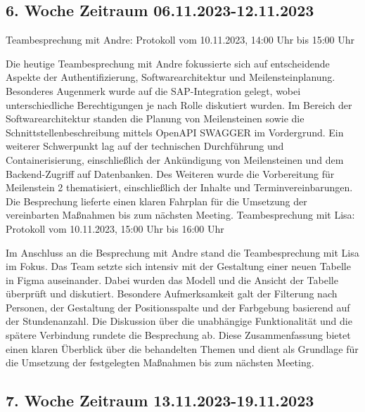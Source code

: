 \documentclass{article}
\begin{document}
\subsection{6. Woche Zeitraum 06.11.2023-12.11.2023}
Teambesprechung mit Andre: Protokoll vom 10.11.2023, 14:00 Uhr bis 15:00 Uhr

Die heutige Teambesprechung mit Andre fokussierte sich auf entscheidende
Aspekte der Authentifizierung, Softwarearchitektur und Meilensteinplanung.
Besonderes Augenmerk wurde auf die SAP-Integration gelegt, wobei
unterschiedliche Berechtigungen je nach Rolle diskutiert wurden. Im Bereich der
Softwarearchitektur standen die Planung von Meilensteinen sowie die
Schnittstellenbeschreibung mittels OpenAPI SWAGGER im Vordergrund. Ein weiterer
Schwerpunkt lag auf der technischen Durchführung und Containerisierung,
einschließlich der Ankündigung von Meilensteinen und dem Backend-Zugriff auf
Datenbanken. Des Weiteren wurde die Vorbereitung für Meilenstein 2
thematisiert, einschließlich der Inhalte und Terminvereinbarungen. Die
Besprechung lieferte einen klaren Fahrplan für die Umsetzung der vereinbarten
Maßnahmen bis zum nächsten Meeting. Teambesprechung mit Lisa: Protokoll vom
10.11.2023, 15:00 Uhr bis 16:00 Uhr

Im Anschluss an die Besprechung mit Andre stand die Teambesprechung mit Lisa im
Fokus. Das Team setzte sich intensiv mit der Gestaltung einer neuen Tabelle in
Figma auseinander. Dabei wurden das Modell und die Ansicht der Tabelle
überprüft und diskutiert. Besondere Aufmerksamkeit galt der Filterung nach
Personen, der Gestaltung der Positionsspalte und der Farbgebung basierend auf
der Stundenanzahl. Die Diskussion über die unabhängige Funktionalität und die
spätere Verbindung rundete die Besprechung ab. Diese Zusammenfassung bietet
einen klaren Überblick über die behandelten Themen und dient als Grundlage für
die Umsetzung der festgelegten Maßnahmen bis zum nächsten Meeting.

\subsection{7. Woche Zeitraum 13.11.2023-19.11.2023}

\newpage



\end{document}
